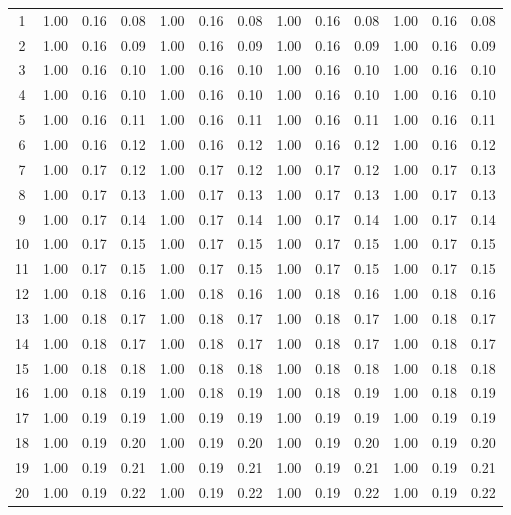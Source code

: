 \begin{center}
\begin{longtable}{|c|c|c|c|c|c|c|c|c|c|c|c|c|}
 1 & 1.00 & 0.16 & 0.08 & 1.00 & 0.16 & 0.08 & 1.00 & 0.16 & 0.08 & 1.00 & 0.16 & 0.08 \\
 2 & 1.00 & 0.16 & 0.09 & 1.00 & 0.16 & 0.09 & 1.00 & 0.16 & 0.09 & 1.00 & 0.16 & 0.09 \\
 3 & 1.00 & 0.16 & 0.10 & 1.00 & 0.16 & 0.10 & 1.00 & 0.16 & 0.10 & 1.00 & 0.16 & 0.10 \\
 4 & 1.00 & 0.16 & 0.10 & 1.00 & 0.16 & 0.10 & 1.00 & 0.16 & 0.10 & 1.00 & 0.16 & 0.10 \\
 5 & 1.00 & 0.16 & 0.11 & 1.00 & 0.16 & 0.11 & 1.00 & 0.16 & 0.11 & 1.00 & 0.16 & 0.11 \\
 6 & 1.00 & 0.16 & 0.12 & 1.00 & 0.16 & 0.12 & 1.00 & 0.16 & 0.12 & 1.00 & 0.16 & 0.12 \\
 7 & 1.00 & 0.17 & 0.12 & 1.00 & 0.17 & 0.12 & 1.00 & 0.17 & 0.12 & 1.00 & 0.17 & 0.13 \\
 8 & 1.00 & 0.17 & 0.13 & 1.00 & 0.17 & 0.13 & 1.00 & 0.17 & 0.13 & 1.00 & 0.17 & 0.13 \\
 9 & 1.00 & 0.17 & 0.14 & 1.00 & 0.17 & 0.14 & 1.00 & 0.17 & 0.14 & 1.00 & 0.17 & 0.14 \\
10 & 1.00 & 0.17 & 0.15 & 1.00 & 0.17 & 0.15 & 1.00 & 0.17 & 0.15 & 1.00 & 0.17 & 0.15 \\
11 & 1.00 & 0.17 & 0.15 & 1.00 & 0.17 & 0.15 & 1.00 & 0.17 & 0.15 & 1.00 & 0.17 & 0.15 \\
12 & 1.00 & 0.18 & 0.16 & 1.00 & 0.18 & 0.16 & 1.00 & 0.18 & 0.16 & 1.00 & 0.18 & 0.16 \\
13 & 1.00 & 0.18 & 0.17 & 1.00 & 0.18 & 0.17 & 1.00 & 0.18 & 0.17 & 1.00 & 0.18 & 0.17 \\
14 & 1.00 & 0.18 & 0.17 & 1.00 & 0.18 & 0.17 & 1.00 & 0.18 & 0.17 & 1.00 & 0.18 & 0.17 \\
15 & 1.00 & 0.18 & 0.18 & 1.00 & 0.18 & 0.18 & 1.00 & 0.18 & 0.18 & 1.00 & 0.18 & 0.18 \\
16 & 1.00 & 0.18 & 0.19 & 1.00 & 0.18 & 0.19 & 1.00 & 0.18 & 0.19 & 1.00 & 0.18 & 0.19 \\
17 & 1.00 & 0.19 & 0.19 & 1.00 & 0.19 & 0.19 & 1.00 & 0.19 & 0.19 & 1.00 & 0.19 & 0.19 \\
18 & 1.00 & 0.19 & 0.20 & 1.00 & 0.19 & 0.20 & 1.00 & 0.19 & 0.20 & 1.00 & 0.19 & 0.20 \\
19 & 1.00 & 0.19 & 0.21 & 1.00 & 0.19 & 0.21 & 1.00 & 0.19 & 0.21 & 1.00 & 0.19 & 0.21 \\
20 & 1.00 & 0.19 & 0.22 & 1.00 & 0.19 & 0.22 & 1.00 & 0.19 & 0.22 & 1.00 & 0.19 & 0.22 \\

\end{longtable}
\end{center}
